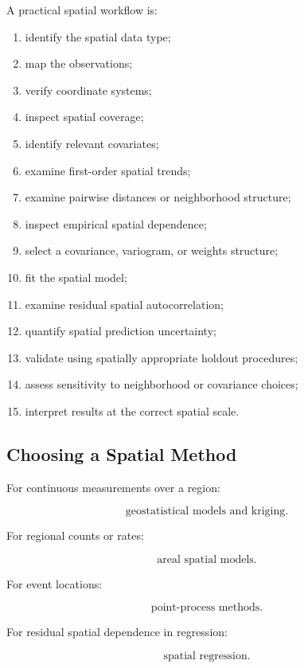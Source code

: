 A practical spatial workflow is:

\begin{enumerate}
    \item identify the spatial data type;
    \item map the observations;
    \item verify coordinate systems;
    \item inspect spatial coverage;
    \item identify relevant covariates;
    \item examine first-order spatial trends;
    \item examine pairwise distances or neighborhood structure;
    \item inspect empirical spatial dependence;
    \item select a covariance, variogram, or weights structure;
    \item fit the spatial model;
    \item examine residual spatial autocorrelation;
    \item quantify spatial prediction uncertainty;
    \item validate using spatially appropriate holdout procedures;
    \item assess sensitivity to neighborhood or covariance choices;
    \item interpret results at the correct spatial scale.
\end{enumerate}

\subsection{Choosing a Spatial Method}
\label{subsec:choosing-spatial-method}

For continuous measurements over a region:

\[
\boxed{
\text{geostatistical models and kriging}.
}
\]

For regional counts or rates:

\[
\boxed{
\text{areal spatial models}.
}
\]

For event locations:

\[
\boxed{
\text{point-process methods}.
}
\]

For residual spatial dependence in regression:

\[
\boxed{
\text{spatial regression}.
}
\]

